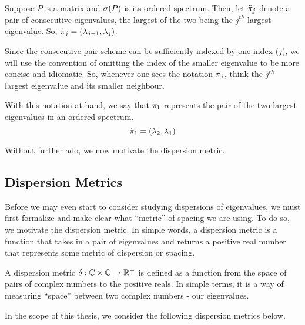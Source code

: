 \begin{definition}
Suppose $P$ is a matrix and $\sigma(P)$ is its ordered spectrum. Then, let ${\tilde{\pi}}_j$ denote a pair of consecutive eigenvalues, the largest of the two being the $j^{th}$ largest eigenvalue. So, ${\tilde{\pi}}_j = (\lambda_{j-1},\lambda_{j})$.
\end{definition}

Since the consecutive pair scheme can be sufficiently indexed by one index ($j$), we will use the convention of omitting the index of the smaller eigenvalue to be more concise and idiomatic. So, whenever one sees the notation ${\tilde{\pi}}_j$, think the $j^{th}$ largest eigenvalue and its smaller neighbour.

\begin{example}
With this notation at hand, we say that ${\tilde{\pi}}_1$ represents the pair of the two largest eigenvalues in an ordered spectrum.
$${\tilde{\pi}}_1 = (\lambda_2,\lambda_1)$$
\end{example}

\noindent Without further ado, we now motivate the dispersion metric.


\subsection{Dispersion Metrics}

Before we may even start to consider studying dispersions of eigenvalues, we must first formalize and make clear what ``metric'' of spacing we are using. To do so, we motivate the dispersion metric. In simple words, a dispersion metric is a function that takes in a pair of eigenvalues and returns a positive real number that represents some metric of dispersion or spacing.

\begin{definition}
A dispersion metric $\delta: \mathbb{C} \times \mathbb{C} \to \mathbb{R}^+$ is defined as a function from the space of pairs of complex numbers to the positive reals. In simple terms, it is a way of measuring ``space'' between two complex numbers - our eigenvalues.
\end{definition}


In the scope of this thesis, we consider the following dispersion metrics below.

